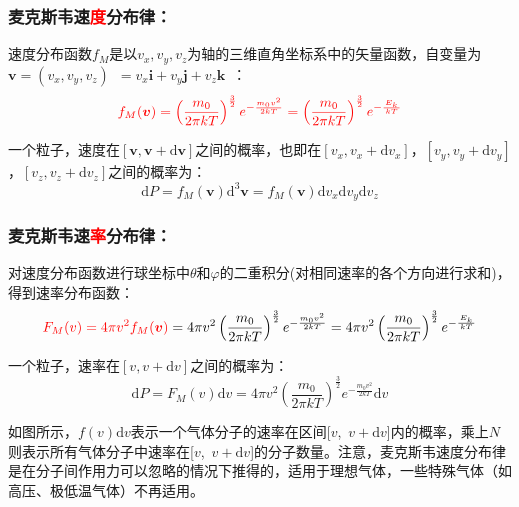 \documentclass[zihao=-4,UTF8]{report}
\begin{document}
\subsubsection{麦克斯韦速\textcolor{red}{度}分布律：}
速度分布函数$f_M$是以$v_x,v_y,v_z$为轴的三维直角坐标系中的矢量函数，自变量为$\boldsymbol{v} = (v_x,v_y,v_z)$\ $ = v_x\boldsymbol{i} +v_y\boldsymbol{j}+v_z\boldsymbol{k}$\ ：
\begin{equation}\textcolor{red}{f_M(\boldsymbol{v}) = \left(\frac{m_0}{2\pi kT}\right)^{\frac{3}{2}}e^{-\frac{m_0v^2}{2kT}} = \left(\frac{m_0}{2\pi kT}\right)^{\frac{3}{2}}e^{-\frac{E_k}{\,kT\,}}}
\end{equation}\par
一个粒子，速度在$[\boldsymbol{v} , \boldsymbol{v} + \mathrm{d}\boldsymbol{v}]$之间的概率，也即在$[v_x ,v_x +\mathrm{d}v_x]$，$[v_y ,v_y +\mathrm{d}v_y]$，$[v_z ,v_z +\mathrm{d}v_z]$之间的概率为：
\begin{equation}
    \mathrm{d} P =f_M(\boldsymbol{v})\mathrm{d}^3\boldsymbol{v}=f_M(\boldsymbol{v})\mathrm{d}v_x\mathrm{d}v_y\mathrm{d}v_z
\end{equation}

\subsubsection{麦克斯韦速\textcolor{red}{率}分布律：}
对速度分布函数进行球坐标中$\theta $和$\varphi$的二重积分(对相同速率的各个方向进行求和)，得到速率分布函数：
\begin{equation}\textcolor{red}{ F_M(v) = 4\pi v^2 f_M(\boldsymbol{v}) }
   = 4\pi v^2\left(\frac{m_0}{2\pi kT}\right)^{\frac{3}{2}}e^{-\frac{m_0v^2}{2kT}} = 4\pi v^2\left(\frac{m_0}{2\pi kT}\right)^{\frac{3}{2}}e^{-\frac{E_k}{\,kT\,}}
\end{equation}\par

一个粒子，速率在$[v, v+\mathrm{d}v]$之间的概率为：
\begin{equation}
    \mathrm{d} P = F_M(v)\mathrm{d}v = 4\pi v^2\left(\frac{m_0}{2\pi kT}\right)^{\frac{3}{2}}e^{-\frac{m_0v^2}{2kT}}\mathrm{d}v
\end{equation}
\par
{\color{gray}\small  如图所示，$f(v)\mathrm{d}v$表示一个气体分子的速率在区间[$v$,\ $v+\mathrm{d}v$]内的概率，乘上$N$则表示所有气体分子中速率在[$v$,\ $v+\mathrm{d}v$]的分子数量。注意，麦克斯韦速度分布律是在分子间作用力可以忽略的情况下推得的，适用于理想气体，一些特殊气体（如高压、极低温气体）不再适用。}
\end{document}
